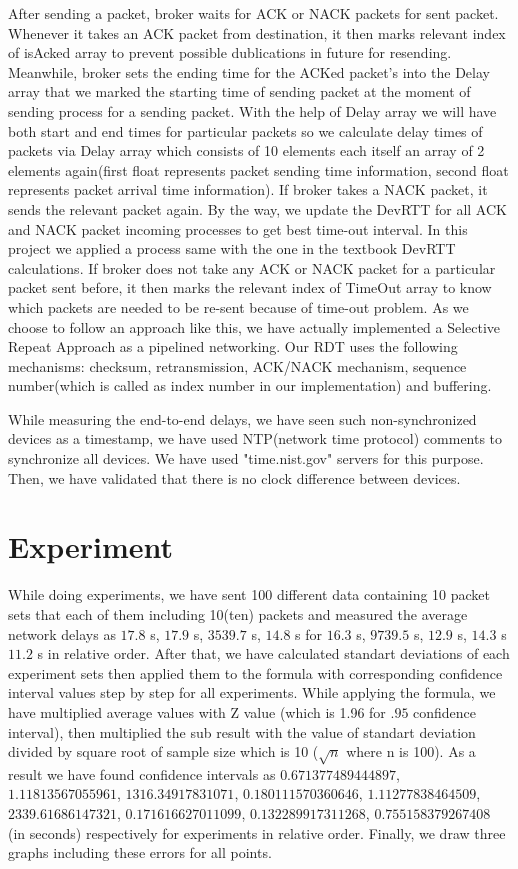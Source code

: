 \documentclass[conference]{IEEEtran}
\begin{document}
After sending a packet, broker waits for ACK or NACK packets for sent packet. Whenever it takes an ACK packet from destination, it then marks relevant index of isAcked array to prevent possible dublications in future for resending. Meanwhile, broker sets the ending time for the ACKed packet's into the Delay array that we marked the starting time of sending packet at the moment of sending process for a sending packet. With the help of Delay array we will have both start and end times for particular packets so we calculate delay times of packets via Delay array which consists of 10 elements each itself an array of 2 elements again(first float represents packet sending time information, second float represents packet arrival time information). If broker takes a NACK packet, it sends the relevant packet again. By the way, we update the DevRTT for all ACK and NACK packet incoming processes to get best time-out interval. In this project we applied a process same with the one in the textbook DevRTT calculations. If broker does not take any ACK or NACK packet for a particular packet sent before, it then marks the relevant index of TimeOut array to know which packets are needed to be re-sent because of time-out problem. As we choose to follow an approach like this, we have actually implemented a Selective Repeat Approach as a pipelined networking. Our RDT uses the following mechanisms: checksum, retransmission, ACK/NACK mechanism, sequence number(which is called as index number in our implementation) and buffering. 

While measuring the end-to-end delays, we have seen such non-synchronized devices as a timestamp, we have used NTP(network time protocol) comments to  synchronize all devices. We have used "time.nist.gov" servers for this purpose. Then, we have validated that there is no clock difference between devices. 

\section{Experiment}

While doing experiments, we have sent 100 different data containing 10 packet sets that each of them including 10(ten) packets and measured the average network delays as $17.8$ s, $17.9$ s, $3539.7$ s, $14.8$ s for $16.3$ s, $9739.5$ s, $12.9$ s, $14.3$ s $11.2$ s in relative order. After that, we have calculated standart deviations of each experiment sets then applied them to the formula with corresponding confidence interval values step by step for all experiments. While applying the formula, we have multiplied average values with Z value (which is 1.96 for $.95$ confidence interval), then multiplied the sub result with the value of standart deviation divided by square root of sample size which is 10 ($\sqrt{n}$ where n is 100). As a result we have found confidence intervals as $0.671377489444897$,
$1.11813567055961$,
$1316.34917831071$,
$0.180111570360646$,
$1.11277838464509$,
$2339.61686147321$,
$0.171616627011099$,
$0.132289917311268$, 
$0.755158379267408$ 
(in seconds) respectively for experiments in relative order.
Finally, we draw three graphs including these errors for all points.
\end{document}

